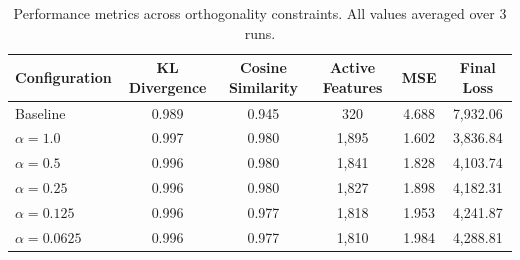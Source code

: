 \documentclass{article} %
\begin{document}
\begin{table}[h]
\centering
\begin{tabular}{lccccc}
\toprule
Configuration & KL Divergence & Cosine Similarity & Active Features & MSE & Final Loss \\
\midrule
Baseline & 0.989 & 0.945 & 320 & 4.688 & 7,932.06 \\
$\alpha=1.0$ & 0.997 & 0.980 & 1,895 & 1.602 & 3,836.84 \\
$\alpha=0.5$ & 0.996 & 0.980 & 1,841 & 1.828 & 4,103.74 \\
$\alpha=0.25$ & 0.996 & 0.980 & 1,827 & 1.898 & 4,182.31 \\
$\alpha=0.125$ & 0.996 & 0.977 & 1,818 & 1.953 & 4,241.87 \\
$\alpha=0.0625$ & 0.996 & 0.977 & 1,810 & 1.984 & 4,288.81 \\
\bottomrule
\end{tabular}
\caption{Performance metrics across orthogonality constraints. All values averaged over 3 runs.}
\label{tab:metrics}
\end{table}
\end{document}
